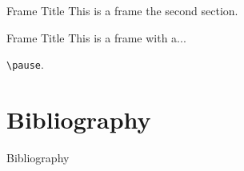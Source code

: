 \documentclass{beamer}
\begin{document}
    \begin{frame}{Frame Title}
        This is a frame the second section.
    \end{frame}

    \begin{frame}{Frame Title}
        This is a frame with a...

        \pause

        \texttt{\textbackslash pause}.
    \end{frame}

\section{Bibliography}

    \nocite{einstein, knuthwebsite, latexcompanion}
    
    \begin{frame}{Bibliography}
        
        
    \end{frame}
\end{document}
